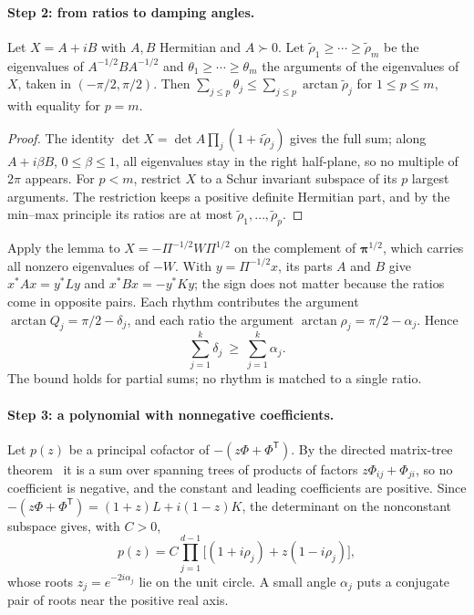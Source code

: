 \paragraph*{Step 2: from ratios to damping angles.}

\begin{lemma}\label{lem:args}
Let $X=A+iB$ with $A,B$ Hermitian and $A\succ0$. Let $\tilde\rho_1\ge\cdots\ge\tilde\rho_m$ be the eigenvalues of $A^{-1/2}BA^{-1/2}$ and $\theta_1\ge\cdots\ge\theta_m$ the arguments of the eigenvalues of $X$, taken in $(-\pi/2,\pi/2)$. Then $\sum_{j\le p}\theta_j\le\sum_{j\le p}\arctan\tilde\rho_j$ for $1\le p\le m$, with equality for $p=m$.
\end{lemma}

\begin{proof}
The identity $\det X=\det A\prod_j(1+i\tilde\rho_j)$ gives the full sum; along $A+i\beta B$, $0\le\beta\le1$, all eigenvalues stay in the right half-plane, so no multiple of $2\pi$ appears. For $p<m$, restrict $X$ to a Schur invariant subspace of its $p$ largest arguments. The restriction keeps a positive definite Hermitian part, and by the min--max principle its ratios are at most $\tilde\rho_1,\dots,\tilde\rho_p$.
\end{proof}

\noindent Apply the lemma to $X=-\Pi^{-1/2}W\Pi^{1/2}$ on the complement of $\bm\pi^{1/2}$, which carries all nonzero eigenvalues of $-W$. With $y=\Pi^{-1/2}x$, its parts $A$ and $B$ give $x^*Ax=y^*Ly$ and $x^*Bx=-y^*Ky$; the sign does not matter because the ratios come in opposite pairs. Each rhythm contributes the argument $\arctan Q_j=\pi/2-\delta_j$, and each ratio the argument $\arctan\rho_j=\pi/2-\alpha_j$. Hence
\begin{equation}
\sum_{j=1}^{k}\delta_j\ \ge\ \sum_{j=1}^{k}\alpha_j .
\label{eq:S-aux}
\end{equation}
The bound holds for partial sums; no rhythm is matched to a single ratio.

\paragraph*{Step 3: a polynomial with nonnegative coefficients.} Let $p(z)$ be a principal cofactor of $-(z\Phi+\Phi^{\mathsf T})$. By the directed matrix-tree theorem~\cite{chaiken1982} it is a sum over spanning trees of products of factors $z\Phi_{ij}+\Phi_{ji}$, so no coefficient is negative, and the constant and leading coefficients are positive. Since $-(z\Phi+\Phi^{\mathsf T})=(1+z)L+i(1-z)K$, the determinant on the nonconstant subspace gives, with $C>0$,
\begin{equation}
p(z)=C\prod_{j=1}^{d-1}\bigl[(1+i\rho_j)+z(1-i\rho_j)\bigr],
\label{eq:S-kirchhoff}
\end{equation}
whose roots $z_j=e^{-2i\alpha_j}$ lie on the unit circle. A small angle $\alpha_j$ puts a conjugate pair of roots near the positive real axis.

